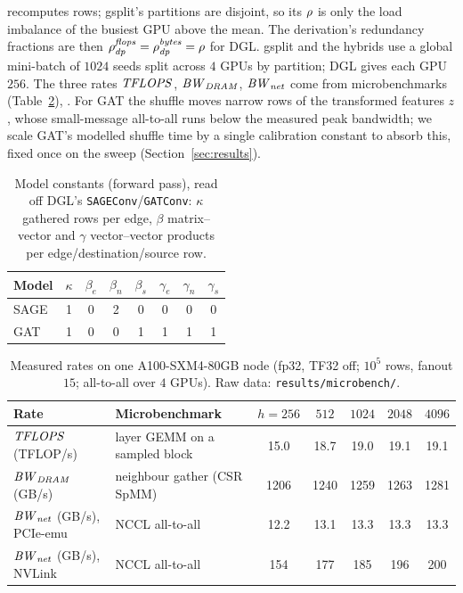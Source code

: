 recomputes rows; gsplit's partitions are disjoint, so its $\rho$ is only the load imbalance of the
busiest GPU above the mean. The derivation's redundancy
fractions are then $\rho^{\mathit{flops}}_{\mathit{dp}}=\rho^{\mathit{bytes}}_{\mathit{dp}}=\rho$ for DGL. gsplit and the hybrids use a global
mini-batch of $1024$ seeds split across $4$ GPUs by partition; DGL gives each GPU $256$. The three
rates $\mathit{TFLOPS}$, $\mathit{BW}_{\mathit{DRAM}}$, $\mathit{BW}_{\mathit{net}}$ come from microbenchmarks (Table~\ref{tab:cm-microbench}),
.
For GAT the shuffle moves narrow rows of the transformed features $z$, whose small-message
all-to-all runs below the measured peak bandwidth; we scale GAT's modelled shuffle time by a single
calibration constant to absorb this, fixed once on the sweep (Section~\ref{sec:results}).

\begin{table}[h]
\centering
\caption{Model constants (forward pass), read off DGL's \texttt{SAGEConv}/\texttt{GATConv}:
$\kappa$ gathered rows per edge, $\beta$ matrix--vector and $\gamma$ vector--vector products per
edge/destination/source row.}
\label{tab:cm-constants}
\small
\begin{tabular}{l c c c c c c c}
\toprule
Model & $\kappa$ & $\beta_e$ & $\beta_n$ & $\beta_s$ & $\gamma_e$ & $\gamma_n$ & $\gamma_s$ \\
\midrule
SAGE & 1 & 0 & 2 & 0 & 0 & 0 & 0 \\
GAT  & 1 & 0 & 0 & 1 & 1 & 1 & 1 \\
\bottomrule
\end{tabular}
\end{table}

\begin{table}[h]
\centering
\caption{Measured rates on one A100-SXM4-80GB node (fp32, TF32 off; $10^5$ rows, fanout $15$;
all-to-all over $4$ GPUs). Raw data: \texttt{results/microbench/}.}
\label{tab:cm-microbench}
\footnotesize
\begin{tabular}{l l c c c c c}
\toprule
Rate & Microbenchmark & $h{=}256$ & $512$ & $1024$ & $2048$ & $4096$ \\
\midrule
$\mathit{TFLOPS}$ (TFLOP/s) & layer GEMM on a sampled block
  & 15.0 & 18.7 & 19.0 & 19.1 & 19.1 \\
$\mathit{BW}_{\mathit{DRAM}}$ (GB/s) & neighbour gather (CSR SpMM)
  & 1206 & 1240 & 1259 & 1263 & 1281 \\
$\mathit{BW}_{\mathit{net}}$ (GB/s), PCIe-emu & NCCL all-to-all
  & 12.2 & 13.1 & 13.3 & 13.3 & 13.3 \\
$\mathit{BW}_{\mathit{net}}$ (GB/s), NVLink & NCCL all-to-all
  & 154 & 177 & 185 & 196 & 200 \\
\bottomrule
\end{tabular}
\end{table}

